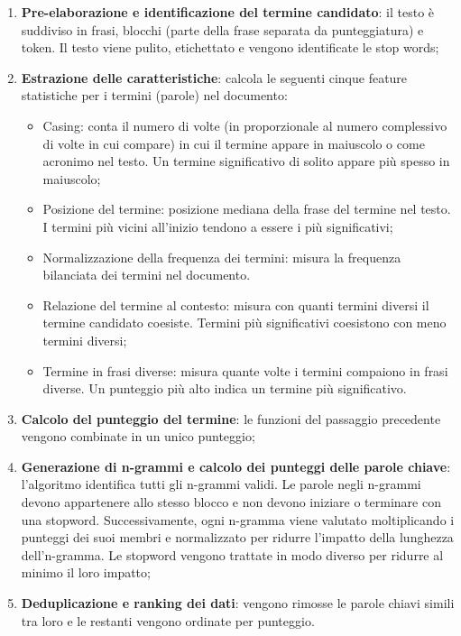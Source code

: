 \begin{enumerate}
\item \textbf{Pre-elaborazione e identificazione del termine candidato}: il testo è suddiviso in frasi, blocchi (parte della frase separata da punteggiatura) e token. Il testo viene pulito, etichettato e vengono identificate le stop words;
\item \textbf{Estrazione delle caratteristiche}: calcola le seguenti cinque feature statistiche per i termini (parole) nel documento:
\begin{itemize}
\item Casing: conta il numero di volte (in proporzionale al numero complessivo di volte in cui compare) in cui il termine appare in maiuscolo o come acronimo nel testo. Un termine significativo di solito appare più spesso in maiuscolo;
\item Posizione del termine: posizione mediana della frase del termine nel testo. I termini più vicini all'inizio tendono a essere i più significativi;
\item Normalizzazione della frequenza dei termini: misura la frequenza bilanciata dei termini nel documento.
\item Relazione del termine al contesto: misura con quanti termini diversi il termine candidato coesiste. Termini più significativi coesistono con meno termini diversi;
\item Termine in frasi diverse: misura quante volte i termini compaiono in frasi diverse. Un punteggio più alto indica un termine più significativo.
\end{itemize}
\item \textbf{Calcolo del punteggio del termine}: le funzioni del passaggio precedente vengono combinate in un unico punteggio;
\item \textbf{Generazione di n-grammi e calcolo dei punteggi delle parole chiave}: l'algoritmo identifica tutti gli n-grammi validi. Le parole negli n-grammi devono appartenere allo stesso blocco e non devono iniziare o terminare con una stopword. Successivamente, ogni n-gramma viene valutato moltiplicando i punteggi dei suoi membri e normalizzato per ridurre l'impatto della lunghezza dell'n-gramma. Le stopword vengono trattate in modo diverso per ridurre al minimo il loro impatto;
\item \textbf{Deduplicazione e ranking dei dati}: vengono rimosse le parole chiavi simili tra loro e le restanti vengono ordinate per punteggio.
\end{enumerate}

